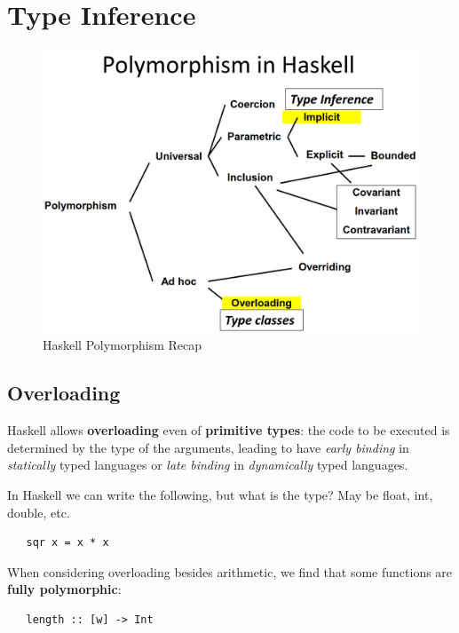 \chapter{Type Inference}
\begin{figure}[htbp]
   \centering
   \includegraphics{images/haskell_polymorphism.png}
   \caption{Haskell Polymorphism Recap}
   \label{fig:haskell_polymorphism}
\end{figure}

\section{Overloading}
Haskell allows \textbf{overloading} even of \textbf{primitive types}:
the code to be executed is determined by the type of the arguments,
leading to have \textit{early binding} in \textit{statically} typed languages
or \textit{late binding} in \textit{dynamically} typed languages.

In Haskell we can write the following, but what is the type? May be float, int, double, etc.
\begin{lstlisting}
   sqr x = x * x
\end{lstlisting}


When considering overloading besides arithmetic, we find that some functions are \textbf{fully polymorphic}:
\begin{lstlisting}
   length :: [w] -> Int
\end{lstlisting}

